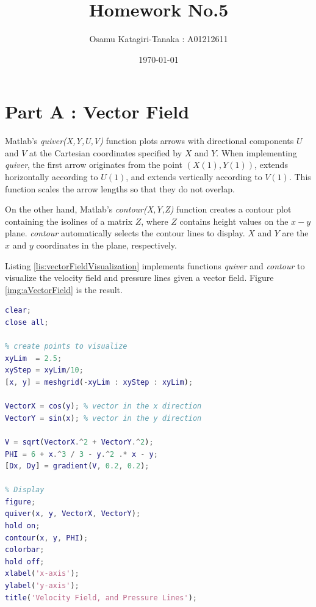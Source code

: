 \documentclass{article}
\title{Homework No.5}
\author{Osamu Katagiri-Tanaka : A01212611}
\date{\today}
\begin{document}
\maketitle

\section{Part A : Vector Field}

Matlab's \emph{quiver(X,Y,U,V)} function plots arrows with directional components $U$ and $V$ at the Cartesian coordinates specified by $X$ and $Y$. When implementing \emph{quiver}, the first arrow originates from the point $(X(1), Y(1))$, extends horizontally according to $U(1)$, and extends vertically according to $V(1)$. This function scales the arrow lengths so that they do not overlap.

On the other hand, Matlab's \emph{contour(X,Y,Z)} function creates a contour plot containing the isolines of a matrix $Z$, where $Z$ contains height values on the $x-y$ plane. \emph{contour} automatically selects the contour lines to display. $X$ and $Y$ are the $x$ and $y$ coordinates in the plane, respectively.

Listing \ref{lis:vectorFieldVisualization} implements functions \emph{quiver} and \emph{contour} to visualize the velocity field and pressure lines given a vector field. Figure \ref{img:aVectorField} is the result.

\begin{lstlisting}[language=Matlab, caption=Vector Field Visualization, label=lis:vectorFieldVisualization]
%% HW05 part A - Velocity Field, adapted from (jose lopez salinas)'s solution 
clear;
close all;

% create points to visualize
xyLim  = 2.5;
xyStep = xyLim/10;
[x, y] = meshgrid(-xyLim : xyStep : xyLim);

VectorX = cos(y); % vector in the x direction
VectorY = sin(x); % vector in the y direction

V = sqrt(VectorX.^2 + VectorY.^2);
PHI = 6 + x.^3 / 3 - y.^2 .* x - y;
[Dx, Dy] = gradient(V, 0.2, 0.2);

% Display
figure;
quiver(x, y, VectorX, VectorY);
hold on;
contour(x, y, PHI);
colorbar;
hold off;
xlabel('x-axis');
ylabel('y-axis');
title('Velocity Field, and Pressure Lines');
\end{lstlisting}
\end{document}
